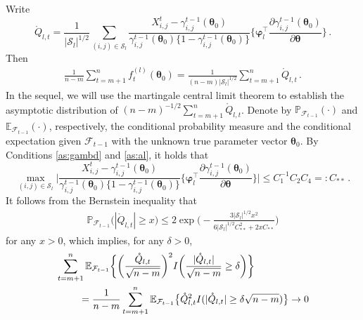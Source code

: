 \documentclass[12pt]{article}
\newcommand{\btheta}{\boldsymbol \theta}
\newcommand{\bvarphi}{\boldsymbol \varphi}
\def\T{{\scriptscriptstyle \top} }
\newcommand{\0}{{\bf 0}}
\begin{document}
Write 
\[
\mathring{Q}_{l,t}=\frac{1}{|\mathcal{S}_l|^{1/2}}\sum_{(i,j)\in\mathcal{S}_l}\frac{X_{i,j}^t-\gamma_{i,j}^{t-1}(\btheta_0)}{\gamma_{i,j}^{t-1}(\btheta_0)\{1-\gamma_{i,j}^{t-1}(\btheta_0)\}}\bigg\{\bvarphi_l^{\T}\frac{\partial\gamma_{i,j}^{t-1}(\btheta_0)}{\partial\btheta}\bigg\}\,.
\]
Then
\begin{align}
\frac{1}{n-m}\sum_{t=m+1}^nf_t^{(l)}(\btheta_0)
=\frac{1}{(n-m)|\mathcal{S}_l|^{1/2}}\sum_{t=m+1}^n\mathring{Q}_{l,t}\,.\label{eq:asymbd9}
\end{align}
In the sequel, we will use the martingale central limit theorem to establish the asymptotic distribution of $(n-m)^{-1/2}\sum_{t=m+1}^n\mathring{Q}_{l,t}$. 
Denote by $\mathbb{P}_{\mathcal{F}_{t-1}}(\cdot)$ and $\mathbb{E}_{\mathcal{F}_{t-1}}(\cdot)$, respectively, the conditional probability measure and the conditional expectation given $\mathcal{F}_{t-1}$ with the unknown true parameter vector $\btheta_0$. By Conditions \ref{as:gambd} and \ref{as:al}, it holds that
\[
\max_{(i,j)\in\mathcal{S}_l}\bigg|\frac{X_{i,j}^t-\gamma_{i,j}^{t-1}(\btheta_0)}{\gamma_{i,j}^{t-1}(\btheta_0)\{1-\gamma_{i,j}^{t-1}(\btheta_0)\}}\bigg\{\bvarphi_l^{\T}\frac{\partial\gamma_{i,j}^{t-1}(\btheta_0)}{\partial\btheta}\bigg\}\bigg|\leq C_1^{-1}C_2C_4=:C_{**}\,.
\] 
It follows from the Bernstein inequality that
\begin{align*}
\mathbb{P}_{\mathcal{F}_{t-1}}\big(|\mathring{Q}_{l,t}|\geq x\big)\leq 2\exp\bigg(-\frac{3|\mathcal{S}_l|^{1/2}x^2}{6|\mathcal{S}_l|^{1/2}C_{**}^2+2xC_{**}}\bigg)
\end{align*}
for any $x>0$, %
which implies, for any $\delta>0$,
\begin{align*}
&\sum_{t=m+1}^n\mathbb{E}_{\mathcal{F}_{t-1}}\bigg\{\bigg(\frac{\mathring{Q}_{l,t}}{\sqrt{n-m}}\bigg)^2I\bigg(\frac{|\mathring{Q}_{l,t}|}{\sqrt{n-m}}\geq\delta\bigg)\bigg\}\notag\\
&~~~~~~~=\frac{1}{n-m}\sum_{t=m+1}^n\mathbb{E}_{\mathcal{F}_{t-1}}\big\{\mathring{Q}_{l,t}^2I(|\mathring{Q}_{l,t}|\geq\delta\sqrt{n-m})\big\}\rightarrow0\label{eq:asymbd7}
\end{align*}
\end{document}
